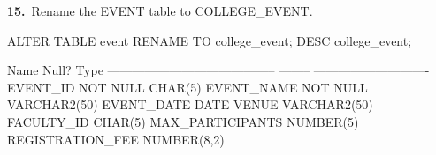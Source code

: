 
\noindent\begin{minipage}{\linewidth}
\begingroup{}
{\fontsize{14}{17}\selectfont\textbf{15.}}\ Rename the EVENT table to COLLEGE\_EVENT.\par
\endgroup\vspace{12pt}


\begin{sqlcode}
ALTER TABLE event RENAME TO college_event;
DESC college_event;
\end{sqlcode}

\vspace{18pt}


\begin{sqlout}
 Name                                      Null?    Type
 ----------------------------------------- -------- ----------------------------
 EVENT_ID                                  NOT NULL CHAR(5)
 EVENT_NAME                                NOT NULL VARCHAR2(50)
 EVENT_DATE                                         DATE
 VENUE                                              VARCHAR2(50)
 FACULTY_ID                                         CHAR(5)
 MAX_PARTICIPANTS                                   NUMBER(5)
 REGISTRATION_FEE                                   NUMBER(8,2)
\end{sqlout}
\end{minipage}\par\vspace{30pt}

